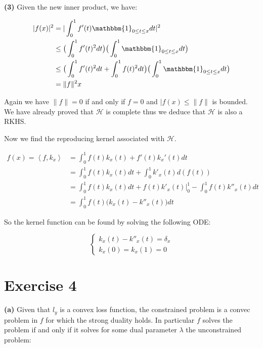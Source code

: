 \documentclass[11pt]{article}
\begin{document}
    \textbf{(3)} Given the new inner product, we have:

    \vspace{-4em}
    \begin{align*}
      |f(x)|^2 &= |\int_0^1 f'(t) \mathbbm{1}_{0 \le t \le x} dt|^2 \\
      &\le \big (\int_0^1 f'(t)^2 dt \big ) \big (\int_0^1 \mathbbm{1}_{0 \le t \le x} dt \big ) \\
      &\le \big (\int_0^1 f'(t)^2 dt + \int_0^1 f(t)^2dt \big ) \big (\int_0^1 \mathbbm{1}_{0 \le t \le x} dt \big ) \\ 
      &= \|f\|^2 x
    \end{align*}
    \vspace{-4em}

    Again we have $\|f\| = 0$ if and only if $f = 0$ and $|f(x) \le \|f\|$ is bounded.
    We have already proved that $\mathcal{H}$ is complete thus we deduce that $\mathcal{H}$ is also a RKHS.
 
    Now we find the reproducing kernel associated with $\mathcal{H}$.

    \vspace{-4em}
    \begin{align*}
      f(x) = \left \langle f, k_x \right \rangle &= \int_0^1 f(t) k_x(t) + f'(t) k_x'(t) dt \\
      &= \int_0^1 f(t) k_x(t) dt + \int_0^1 k'_x(t) d(f(t)) \\
      &= \int_0^1 f(t) k_x(t) dt + f(t)k'_x(t) \Big |_0^1 - \int_0^1 f(t) k''_x(t) dt \\
      &= \int_0^1 f(t) \big (k_x(t) - k''_x(t) \big ) dt 
    \end{align*}
    \vspace{-4em}

    So the kernel function can be found by solving the following ODE:
    
    \vspace{-2em}
    $$
    \begin{cases} 
      k_x(t) - k''_x(t) = \delta_x \\
      k_x (0) = k_x(1) = 0
    \end{cases}
    $$
    \vspace{-2em}

    \section*{Exercise 4}

    \textbf{(a)} Given that $l_y$ is a convex loss function, the constrained problem is a convec problem in $f$
    for which the strong duality holds. In particular $f$ solves the problem if and only if it solves for some dual parameter
    $\lambda$ the unconstrained problem:
\end{document}
